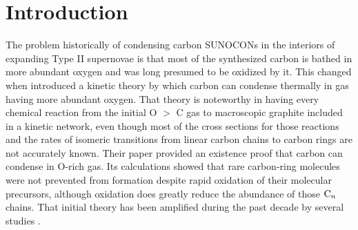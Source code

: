 \documentclass[manuscript]{aastex}
\newcommand{\cenn}{{\rm C}_n}
\begin{document}


\section{Introduction}

The problem historically of condensing carbon SUNOCONs in the interiors of
expanding Type II supernovae is that most of the synthesized carbon is bathed
in more abundant oxygen and was long presumed to be oxidized by it. This
changed when \citet{1999Sci...283.1290C} introduced a kinetic theory by
which carbon can condense thermally in gas having more abundant oxygen.
That theory is noteworthy in having every chemical reaction from the initial
O $>$ C gas to macroscopic graphite included in a kinetic network, even though
most of the cross sections for those reactions and the rates of isomeric
transitions from linear carbon chains to carbon rings are not accurately known.
Their paper provided an existence proof that carbon can condense in O-rich gas.
Its calculations showed that rare carbon-ring molecules were not prevented from
formation despite rapid oxidation of their molecular precursors, although
oxidation does greatly reduce the abundance of those $\cenn$ chains.
That initial
theory has been amplified during the past decade by several studies
\citep{2001ApJ...562..480C,2003ApJ...594..312D,2006ApJ...638..234D,
2009ApJ...703..642C,2010ApJ...713....1C,2011NewAR..55..155C,
2013ApJ...762....5C}.
\end{document}
